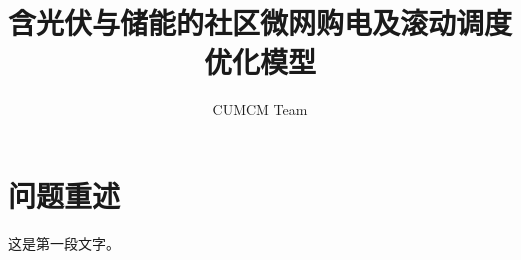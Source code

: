\documentclass[12pt]{ctexart}
\title{含光伏与储能的社区微网购电及滚动调度优化模型}
\author{CUMCM Team}
\date{}
\begin{document}
\maketitle

\tableofcontents

\section{问题重述}

这是第一段文字。
\end{document}

